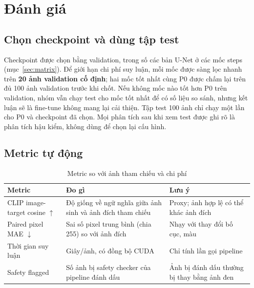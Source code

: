 \documentclass[12pt,a4paper]{article}
\begin{document}
\section{Đánh giá}
\label{sec:eval}

\subsection{Chọn checkpoint và dùng tập test}
\label{sec:select}

Checkpoint được chọn bằng validation, trong số các bản U-Net ở các mốc steps
(mục~\ref{sec:matrix}). Để giới hạn chi phí suy luận, mỗi mốc được sàng lọc nhanh
trên \textbf{20 ảnh validation cố định}; hai mốc tốt nhất cùng P0 được chấm lại trên
đủ 100 ảnh validation trước khi chốt. Nếu không mốc nào tốt hơn P0 trên validation,
nhóm vẫn chạy test cho mốc tốt nhất để có số liệu so sánh, nhưng kết luận sẽ là
fine-tune không mang lại cải thiện. Tập test 100 ảnh chỉ chạy một lần cho P0 và
checkpoint đã chọn. Mọi phân tích sau khi xem test được ghi rõ là phân tích hậu
kiểm, không dùng để chọn lại cấu hình.

\subsection{Metric tự động}

\begin{table}[H]
\centering
\caption{Metric so với ảnh tham chiếu và chi phí}
\small
\begin{tabular}{>{\raggedright\arraybackslash}p{3.8cm}>{\raggedright\arraybackslash}p{5.2cm}>{\raggedright\arraybackslash}p{5.6cm}}
\toprule
Metric & Đo gì & Lưu ý \\
\midrule
CLIP image-target cosine $\uparrow$ & Độ giống về ngữ nghĩa giữa ảnh sinh và ảnh đích
tham chiếu & Proxy; ảnh hợp lệ có thể khác ảnh đích \\
Paired pixel MAE $\downarrow$ & Sai số pixel trung bình (chia 255) so với ảnh đích &
Nhạy với thay đổi bố cục, màu \\
Thời gian suy luận & Giây/ảnh, có đồng bộ CUDA & Chỉ tính lần gọi pipeline \\
Safety flagged & Số ảnh bị safety checker của pipeline đánh dấu & Ảnh bị đánh dấu
thường bị thay bằng ảnh đen \\
\bottomrule
\end{tabular}
\end{table}
\end{document}
